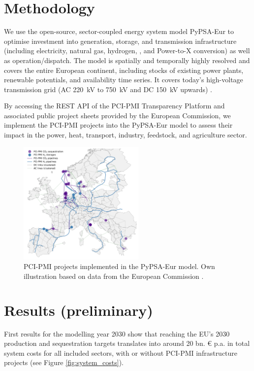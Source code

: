 \documentclass[10pt]{article}
\let\autocite\cite
\begin{document}
\section*{Methodology}

We use the open-source, sector-coupled energy system model PyPSA-Eur \autocite{horschPyPSAEurOpenOptimisation2018} to optimise investment into generation, storage, and transmission infrastructure (including electricity, natural gas, hydrogen, , and Power-to-X conversion) as well as operation/dispatch. The model is spatially and temporally highly resolved and covers the entire European continent, including stocks of existing power plants, renewable potentials, and availability time series. It covers today's high-voltage transmission grid (AC \SI{220}{kV} to \SI{750}{kV} and DC \SI{150}{kV} upwards) \autocite{xiongModellingHighVoltageGrid2024}.

By accessing the REST API of the PCI-PMI Transparency Platform \autocite{europeancommissionPCIPMITransparencyPlatform2024} and associated public project sheets provided by the European Commission, we implement the PCI-PMI projects into the PyPSA-Eur model to assess their impact in the power, heat, transport, industry, feedstock, and agriculture sector.

\begin{figure}[!htbp]
    \centering
    \includegraphics[width=0.55\textwidth]{pci_pmi_projects_map}
    \caption{PCI-PMI projects implemented in the PyPSA-Eur model. Own illustration based on data from the European Commission \autocite{europeancommissionPCIPMITransparencyPlatform2024}.}
    \label{fig:pci_pmi_projects_map}
\end{figure}

\newpage
\section*{Results (preliminary)}
First results for the modelling year 2030 show that reaching the EU's 2030  production and  sequestration targets translates into around 20 bn. \euro{} p.a. in total system costs for all included sectors, with or without PCI-PMI infrastructure projects (see Figure \ref{fig:system_costs}).
\end{document}
